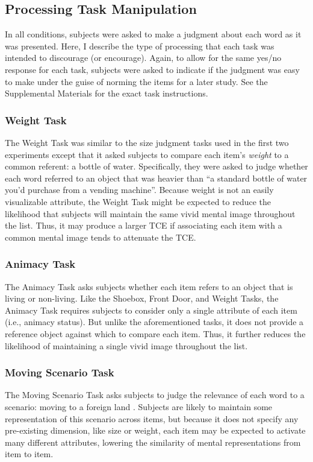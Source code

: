 \documentclass[man,natbib,floatsintext]{apa6} %
\begin{document}
\subsection{Processing Task Manipulation}
In all conditions, subjects were asked to make a judgment about each word as it was presented. Here, I describe the type of processing that each task was intended to discourage (or encourage). Again, to allow for the same yes/no response for each task, subjects were asked to indicate if the judgment was easy to make under the guise of norming the items for a later study. See the Supplemental Materials for the exact task instructions.



\subsubsection{Weight Task} The Weight Task was similar to the size judgment tasks used in the first two experiments except that it asked subjects to compare each item's \emph{weight} to a common referent: a bottle of water. Specifically, they were asked to judge whether each word referred to an object that was heavier than ``a standard bottle of water you'd purchase from a vending machine''. Because weight is not an easily visualizable attribute, the Weight Task might be expected to reduce the likelihood that subjects will maintain the same vivid mental image throughout the list. Thus, it may produce a larger TCE if associating each item with a common mental image tends to attenuate the TCE.

\subsubsection{Animacy Task} The Animacy Task asks subjects whether each item refers to an object that is living or non-living. Like the Shoebox, Front Door, and Weight Tasks, the Animacy Task requires subjects to consider only a single attribute of each item (i.e., animacy status). But unlike the aforementioned tasks, it does not provide a reference object against which to compare each item. Thus, it further reduces the likelihood of maintaining a single vivid image throughout the list.

\subsubsection{Moving Scenario Task} The Moving Scenario Task asks subjects to judge the relevance of each word to a scenario: moving to a foreign land \citep{NairEtal17}. Subjects are likely to maintain some representation of this scenario across items, but because it does not specify any pre-existing dimension, like size or weight, each item may be expected to activate many different attributes, lowering the similarity of mental representations from item to item.
\end{document}
